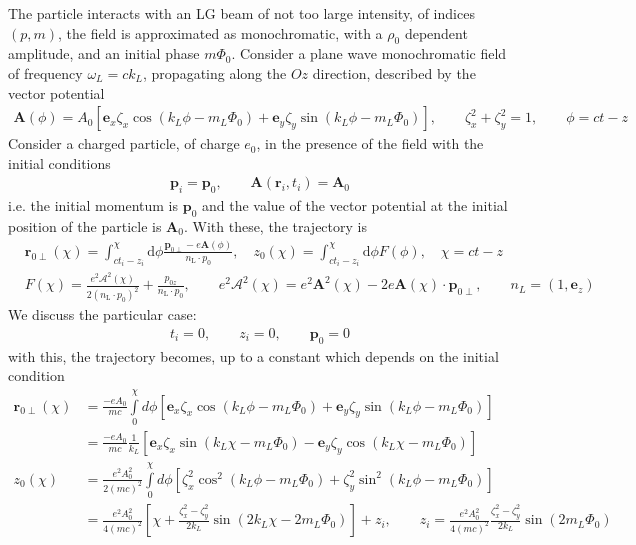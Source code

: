 The particle interacts with an LG beam of not too large intensity, of indices $(p,m)$, the field is approximated as monochromatic, with a $\rho_0$ dependent amplitude, and an initial phase $m\varPhi_0$.
Consider a plane wave monochromatic field of frequency $\omega_L=ck_L$, propagating along the $Oz$ direction, described by the vector potential
\begin{align}
    {\bm A}(\phi)=A_0\left[ {\bm e}_x\zeta_x \cos(k_L\phi-m_L\varPhi_0)+{\bm e}_y\zeta_y\sin(k_L\phi-m_L\varPhi_0)\right],\qquad \zeta_x^2+\zeta_y^2=1,\qquad \phi=ct-z
\end{align}
Consider a charged particle, of charge $e_0$, in the presence of the field with the initial conditions
\begin{align}
    {\bm p}_i={\bm p}_0, \qquad{\bm A}({\bm r}_i,t_i)={\bm A}_0
\end{align}
i.e. the initial momentum is ${\bm p}_0$ and the value of the vector potential at the initial position of the particle is ${\bm A}_0$. With these, the trajectory is
\begin{align}
     & \bm{r}_{0\perp}(\chi)=\int_{c t_i-z_i}^\chi \mathrm{d} \phi \frac{\bm{p}_{0 \perp}-e \bm{A}(\phi)}{n_{\mathrm{L}} \cdot p_0}, \quad z_0(\chi)=\int_{c t_i-z_i}^\chi \mathrm{d} \phi F(\phi),\quad \chi = ct-z\nonumber                                      \\
     & F(\chi) =\frac{e^2 \mathcal{A}^2(\chi)}{2\left(n_{\mathrm{L}} \cdot p_0\right)^2}+\frac{p_{0 z}}{n_{\mathrm{L}} \cdot p_0}, \qquad e^2 \mathcal{A}^2(\chi)=e^2 \mathbf{A}^2(\chi)-2 e \mathbf{A}(\chi) \cdot \mathbf{p}_{0 \perp}, \qquad n_L=(1,{\bm e}_z)
\end{align}
We discuss the particular case:
\begin{align}
    t_i=0,\qquad z_i=0,\qquad {\bm p}_0 = 0
\end{align}
with this, the trajectory becomes, up to a constant which depends on the initial condition
\begin{align}
    {\bm r}_{0\perp}(\chi) & =\frac{-eA_0}{mc}\int\limits_{0}^\chi d\phi\left[ {\bm e}_x\zeta_x \cos(k_L\phi-m_L\varPhi_0)+{\bm e}_y\zeta_y\sin(k_L\phi-m_L\varPhi_0)\right]\nonumber                                              \\
                           & =\frac{-eA_0}{mc}\frac1{k_L}\left[{\bm e}_x\zeta_x\sin(k_L\chi-m_L\varPhi_0)-{\bm e}_y\zeta_y\cos(k_L\chi-m_L\varPhi_0)\right]\nonumber                                                               \\
    z_0(\chi)              & = \frac{e^2A_0^2}{2(mc)^2}\int\limits_0^\chi d\phi\left[\zeta_x^2\cos^2(k_L\phi-m_L\varPhi_0)+\zeta_y^2\sin^2(k_L\phi-m_L\varPhi_0)\right]\nonumber                                                   \\
                           & =\frac{e^2A_0^2}{4(mc)^2}\left[\chi+\frac{\zeta_x^2-\zeta_y^2}{2k_L}\sin(2k_L\chi-2m_L\varPhi_0)\right]+z_i, \qquad z_i = \frac{e^2A_0^2}{4(mc)^2}\frac{\zeta_x^2-\zeta_y^2}{2k_L}\sin(2m_L\varPhi_0)
\end{align}
